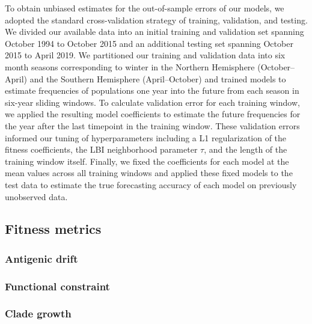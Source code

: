 To obtain unbiased estimates for the out-of-sample errors of our models, we adopted the standard cross-validation strategy of training, validation, and testing.
We divided our available data into an initial training and validation set spanning October 1994 to October 2015 and an additional testing set spanning October 2015 to April 2019.
We partitioned our training and validation data into six month seasons corresponding to winter in the Northern Hemisphere (October--April) and the Southern Hemisphere (April--October) and trained models to estimate frequencies of populations one year into the future from each season in six-year sliding windows.
To calculate validation error for each training window, we applied the resulting model coefficients to estimate the future frequencies for the year after the last timepoint in the training window.
These validation errors informed our tuning of hyperparameters including a L1 regularization of the fitness coefficients, the LBI neighborhood parameter $\tau$, and the length of the training window itself.
Finally, we fixed the coefficients for each model at the mean values across all training windows and applied these fixed models to the test data to estimate the true forecasting accuracy of each model on previously unobserved data.

\subsection*{Fitness metrics}

\subsubsection*{Antigenic drift}

\subsubsection*{Functional constraint}

\subsubsection*{Clade growth}

